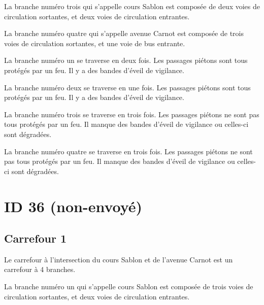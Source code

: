 \begin{appendix}
\newpar{}

La branche numéro trois qui s'appelle cours Sablon est composée de deux voies de circulation sortantes, et deux voies de circulation entrantes. 

\newpar{}

La branche numéro quatre qui s'appelle avenue Carnot est composée de trois voies de circulation sortantes, et une voie de bus entrante. 

\newpar{}

La branche numéro un se traverse en deux fois. Les passages piétons sont tous protégés par un feu. Il y a des bandes d'éveil de vigilance.

\newpar{}

La branche numéro deux se traverse en une fois. Les passages piétons sont tous protégés par un feu. Il y a des bandes d'éveil de vigilance.

\newpar{}

La branche numéro trois se traverse en trois fois. Les passages piétons ne sont pas tous protégés par un feu. Il manque des bandes d'éveil de vigilance ou celles-ci sont dégradées.

\newpar{}

La branche numéro quatre se traverse en trois fois. Les passages piétons ne sont pas tous protégés par un feu. Il manque des bandes d'éveil de vigilance ou celles-ci sont dégradées.

\section*{ID 36 (non-envoyé)}

\label{annexe:q_ID36}

\subsection*{Carrefour 1}

\label{annexe:q_ID36_carrefour1}

Le carrefour à l'intersection du cours Sablon et de l'avenue Carnot est un carrefour à 4 branches.

\newpar{}


\newpar{}

La branche numéro un qui s'appelle cours Sablon est composée de trois voies de circulation sortantes, et deux voies de circulation entrantes.


\end{appendix}
